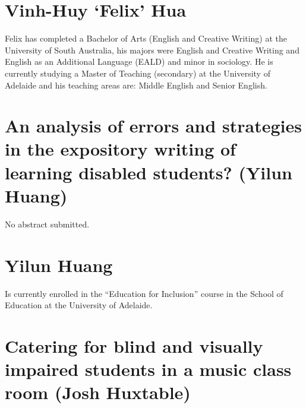 \documentclass[twoside,14pt,a4paper,notitlepage]{memoir}
\begin{document}
\section*{Vinh-Huy `Felix’ Hua}

Felix has completed a Bachelor of Arts (English and Creative Writing) at the University of South Australia, his majors were English and Creative Writing and English as an Additional Language (EALD) and minor in sociology. He is currently studying a Master of Teaching (secondary) at the University of Adelaide and his teaching areas are: Middle English and Senior English.




\section*{An analysis of errors and strategies in the expository writing of learning disabled students? (Yilun Huang)}
\label{aut:huang}

No abstract submitted.

\section*{Yilun Huang}

Is currently enrolled in the ``Education for Inclusion'' course in the School of Education at the University of Adelaide.



\section*{Catering for blind and visually impaired students in a music class room (Josh Huxtable)}
\label{aut:huxtable}
\end{document}
